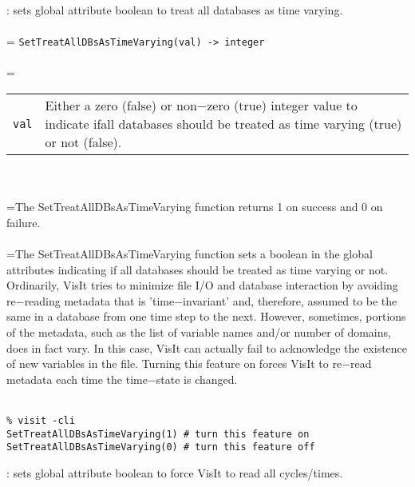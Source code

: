 \documentclass[10pt,a4paper]{report}
\begin{document}
{}
: sets global attribute boolean to treat all databases as time varying.\\[-3mm]

 \\ 
\hangindent=\parindent 
\verb!SetTreatAllDBsAsTimeVarying(val) -> integer!\\ [-3mm]

 \\ 
\hangindent=\parindent 
\begin{tabular}{lp{9cm}}
\verb!val! & Either a zero (false) or non$-$zero (true) integer value to indicate ifall databases should be treated as time varying (true) or not (false). \\
\end{tabular} \\[-2mm]


 \\ 
\hangindent=\parindent The SetTreatAllDBsAsTimeVarying function returns 1 on success and 0 on failure. \\[-3mm] 

 \\ 
\hangindent=\parindent The SetTreatAllDBsAsTimeVarying function sets a boolean in the global attributes indicating if all databases should be treated as time varying or not. Ordinarily, VisIt tries to minimize file I/O and database interaction by avoiding re$-$reading metadata that is 'time$-$invariant' and, therefore, assumed to be the same in a database from one time step to the next. However, sometimes, portions of the metadata, such as the list of variable names and/or number of domains, does in fact vary. In this case, VisIt can actually fail to acknowledge the existence of new variables in the file. Turning this feature on forces VisIt to re$-$read metadata each time the time$-$state is changed. \\[-3mm] 

\\[-6mm]
\begin{verbatim}% visit -cli
SetTreatAllDBsAsTimeVarying(1) # turn this feature on
SetTreatAllDBsAsTimeVarying(0) # turn this feature off
\end{verbatim}
\newpage


{}
: sets global attribute boolean to force VisIt to read all cycles/times.\\[-3mm]
\end{document}
